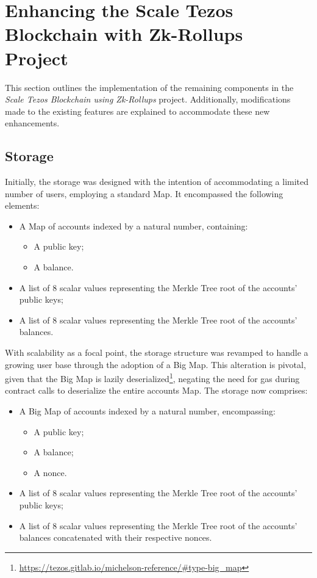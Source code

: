 \section{Enhancing the Scale Tezos Blockchain with Zk-Rollups Project}
This section outlines the implementation of the remaining components in the \textit{Scale Tezos Blockchain using Zk-Rollups} project. Additionally, modifications made to the existing features are explained to accommodate these new enhancements.

\subsection{Storage}

Initially, the storage was designed with the intention of accommodating a limited number of users, employing a standard Map. It encompassed the following elements:
\begin{itemize}
	\item A Map of accounts indexed by a natural number, containing:
		\begin{itemize}
			\item A public key;
			\item A balance.
		\end{itemize}
	\item A list of 8 scalar values representing the Merkle Tree root of the accounts' public keys;
	\item A list of 8 scalar values representing the Merkle Tree root of the accounts' balances.
\end{itemize}

With scalability as a focal point, the storage structure was revamped to handle a growing user base through the adoption of a Big Map. This alteration is pivotal, given that the Big Map is lazily deserialized\footnote{\url{https://tezos.gitlab.io/michelson-reference/\#type-big_map}}, negating the need for gas during contract calls to deserialize the entire accounts Map. The storage now comprises:
\begin{itemize}
	\item A Big Map of accounts indexed by a natural number, encompassing:
		\begin{itemize}
			\item A public key;
			\item A balance;
			\item A nonce.
		\end{itemize}
	\item A list of 8 scalar values representing the Merkle Tree root of the accounts' public keys;
	\item A list of 8 scalar values representing the Merkle Tree root of the accounts' balances concatenated with their respective nonces.
\end{itemize}

